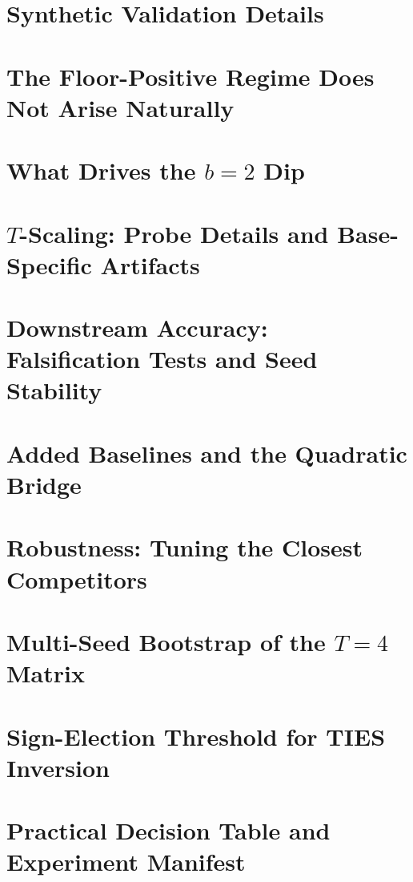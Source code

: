 \documentclass{article}
\theoremstyle{definition}
\theoremstyle{remark}
\begin{document}



\appendix
\section{Synthetic Validation Details}\label{app:synthetic}


\section{The Floor-Positive Regime Does Not Arise Naturally}\label{app:e5}


\section{What Drives the $b=2$ Dip}\label{app:b2}


\section{$T$-Scaling: Probe Details and Base-Specific Artifacts}\label{app:tscaling}


\section{Downstream Accuracy: Falsification Tests and Seed Stability}\label{app:downstream}


\section{Added Baselines and the Quadratic Bridge}\label{app:baselines}


\section{Robustness: Tuning the Closest Competitors}\label{app:robustness}


\section{Multi-Seed Bootstrap of the $T=4$ Matrix}\label{app:multiseed}


\section{Sign-Election Threshold for TIES Inversion}\label{app:sign-election-threshold}


\section{Practical Decision Table and Experiment Manifest}\label{app:manifest}

\end{document}
